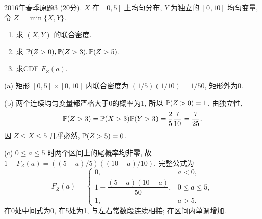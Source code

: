 \begin{exercise}\label{m2:2016s:q3}
2016年春季原题3 (20分). $X$ 在 $[0,5]$ 上均匀分布, $Y$ 为独立的 $[0,10]$ 均匀变量, 令 $Z=\min\{X,Y\}$.
\begin{enumerate}
\item[(a)]\label{m2:2016s:q3:a} 求 $(X,Y)$ 的联合密度.
\item[(b)]\label{m2:2016s:q3:b} 求 $\mathbb P(Z>0),\mathbb P(Z>3),\mathbb P(Z>5)$.
\item[(c)]\label{m2:2016s:q3:c} 求CDF $F_Z(a)$.
\end{enumerate}
\end{exercise}
\begin{solution}
(a) 矩形 $[0,5]\times[0,10]$ 内联合密度为 $(1/5)(1/10)=1/50$, 矩形外为0.

(b) 两个连续均匀变量都严格大于0的概率为1, 所以 $\mathbb P(Z>0)=1$. 由独立性,
\[
\mathbb P(Z>3)=\mathbb P(X>3)\mathbb P(Y>3)=\frac25\frac7{10}=\frac7{25}.
\]
因 $Z\le X\le5$ 几乎必然, $\mathbb P(Z>5)=0$.

(c) $0\le a\le5$ 时两个区间上的尾概率均非零, 故 $1-F_Z(a)=((5-a)/5)((10-a)/10)$. 完整公式为
\[
F_Z(a)=\begin{cases}0,&a<0,\\1-\dfrac{(5-a)(10-a)}{50},&0\le a\le5,\\1,&a>5.\end{cases}
\]
在0处中间式为0, 在5处为1, 与左右常数段连续相接; 在区间内单调增加.
\end{solution}

